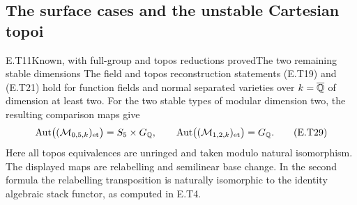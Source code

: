 \subsection{The surface cases and the unstable Cartesian topoi}

\begin{result}{E.T11}{Known, with full-group and topos reductions proved}{The two remaining stable dimensions}
The field and topos reconstruction statements (E.T19) and (E.T21)
hold for function fields and normal separated varieties over
$k=\overline{\mathbb Q}$ of dimension at least two.  For the two stable
types of modular dimension two, the resulting comparison maps give
\[
 \operatorname{Aut}\bigl((\mathcal M_{0,5,k})_{\mathrm{et}}\bigr)
       =S_5\times G_{\mathbb Q},\qquad
 \operatorname{Aut}\bigl((\mathcal M_{1,2,k})_{\mathrm{et}}\bigr)=G_{\mathbb Q}.
                                                               \tag{E.T29}
\]
Here all topos equivalences are unringed and taken modulo natural
isomorphism.  The displayed maps are relabelling and semilinear
base change.  In the second formula the relabelling transposition
is naturally isomorphic to the identity algebraic stack functor,
as computed in E.T4.
\end{result}
